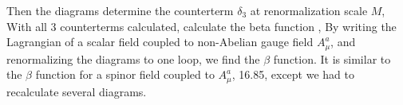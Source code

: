 \documentclass{article}
\begin{document}
Then the diagrams determine the counterterm $\delta_3$ at renormalization scale $M$,
With all 3 counterterms calculated, calculate the beta function ,
By writing the Lagrangian of a scalar field coupled to non-Abelian gauge field $A_\mu^a$, and renormalizing the diagrams to one loop, we find the $\beta$ function. It is similar to the $\beta$ function for a spinor field coupled to $A_\mu^a$, 16.85, except we had to recalculate several diagrams.
\end{document}
